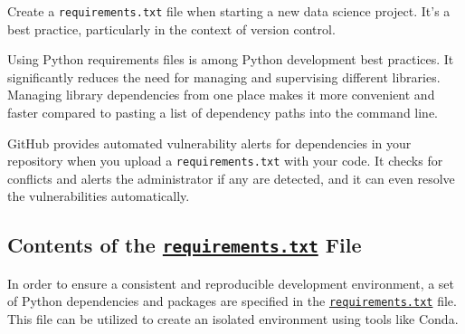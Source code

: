 Create a \texttt{requirements.txt} file when starting a new data science project. It's a best practice, particularly in the context of version control.

Using Python requirements files is among Python development best practices. It significantly reduces the need for managing and supervising different libraries. Managing library dependencies from one place makes it more convenient and faster compared to pasting a list of dependency paths into the command line.

GitHub provides automated vulnerability alerts for dependencies in your repository when you upload a \texttt{requirements.txt} with your code. It checks for conflicts and alerts the administrator if any are detected, and it can even resolve the vulnerabilities automatically.

\subsection{Contents of the \href{run:../Code/KeywordSpotting/envRequirements/requirements.txt}{\texttt{requirements.txt}} File}

In order to ensure a consistent and reproducible development environment, a set of Python dependencies and packages are specified in the \href{run:../Code/KeywordSpotting/envRequirements/requirements.txt}{\texttt{requirements.txt}} file. This file can be utilized to create an isolated environment using tools like Conda.

